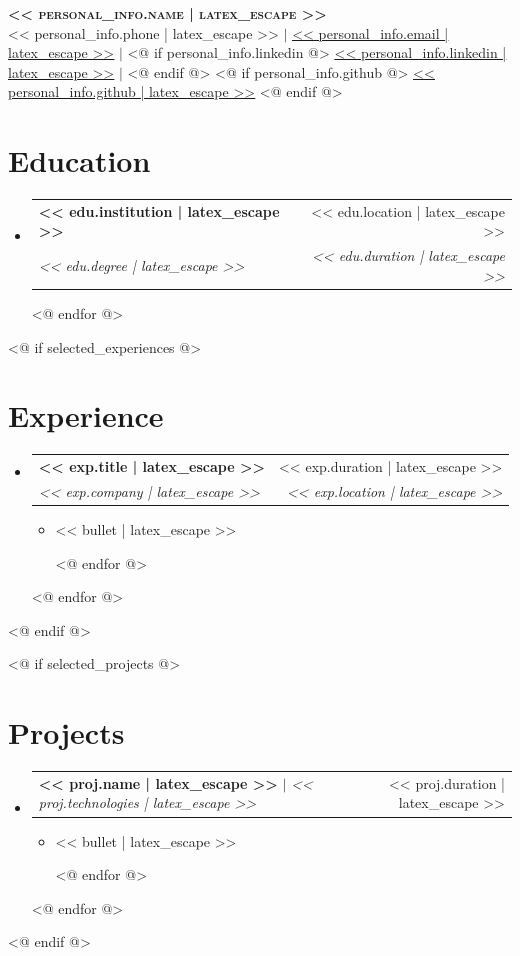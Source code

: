 \documentclass[letterpaper,11pt]{article}
\makeatletter
\newcommand{\resumeItem}[1]{
  \item\small{
    {#1 \vspace{-2pt}}
  }
}
\newcommand{\resumeSubheading}[4]{
  \vspace{-2pt}\item
    \begin{tabular*}{0.97\textwidth}[t]{l@{\extracolsep{\fill}}r}
      \textbf{#1} & #2 \\
      \textit{\small#3} & \textit{\small #4} \\
    \end{tabular*}\vspace{-7pt}
}
\newcommand{\resumeProjectHeading}[2]{
    \item
    \begin{tabular*}{0.97\textwidth}{l@{\extracolsep{\fill}}r}
      \small#1 & #2 \\
    \end{tabular*}\vspace{-7pt}
}
\newcommand{\resumeSubHeadingListStart}{\begin{itemize}[leftmargin=0.15in, label={}]}
\newcommand{\resumeSubHeadingListEnd}{\end{itemize}}
\newcommand{\resumeItemListStart}{\begin{itemize}}
\newcommand{\resumeItemListEnd}{\end{itemize}\vspace{-5pt}}
\makeatother
\begin{document}
\begin{center}
    \textbf{\Huge \scshape << personal_info.name | latex_escape >>} \\ \vspace{1pt}
    \small << personal_info.phone | latex_escape >> $|$
    \href{mailto:<< personal_info.email >>}{\underline{<< personal_info.email | latex_escape >>}} $|$
    <@ if personal_info.linkedin @>
    \href{<< personal_info.linkedin | normalize_url >>}{\underline{<< personal_info.linkedin | latex_escape >>}} $|$
    <@ endif @>
    <@ if personal_info.github @>
    \href{<< personal_info.github | normalize_url >>}{\underline{<< personal_info.github | latex_escape >>}}
    <@ endif @>
\end{center}

\section{Education}
  \resumeSubHeadingListStart
    <@ for edu in education @>
    \resumeSubheading
      {<< edu.institution | latex_escape >>}{<< edu.location | latex_escape >>}
      {<< edu.degree | latex_escape >>}{<< edu.duration | latex_escape >>}
    <@ endfor @>
  \resumeSubHeadingListEnd

<@ if selected_experiences @>
\section{Experience}
  \resumeSubHeadingListStart
    <@ for exp in selected_experiences @>
    \resumeSubheading
      {<< exp.title | latex_escape >>}{<< exp.duration | latex_escape >>}
      {<< exp.company | latex_escape >>}{<< exp.location | latex_escape >>}
      \resumeItemListStart
        <@ for bullet in exp.optimized_bullet_points @>
        \resumeItem{<< bullet | latex_escape >>}
        <@ endfor @>
      \resumeItemListEnd
    <@ endfor @>
  \resumeSubHeadingListEnd
<@ endif @>

<@ if selected_projects @>
\section{Projects}
    \resumeSubHeadingListStart
      <@ for proj in selected_projects @>
      \resumeProjectHeading
          {\textbf{<< proj.name | latex_escape >>} $|$ \emph{<< proj.technologies | latex_escape >>}}{<< proj.duration | latex_escape >>}
          \resumeItemListStart
            <@ for bullet in proj.optimized_bullet_points @>
            \resumeItem{<< bullet | latex_escape >>}
            <@ endfor @>
          \resumeItemListEnd
      <@ endfor @>
    \resumeSubHeadingListEnd
<@ endif @>
\end{document}
